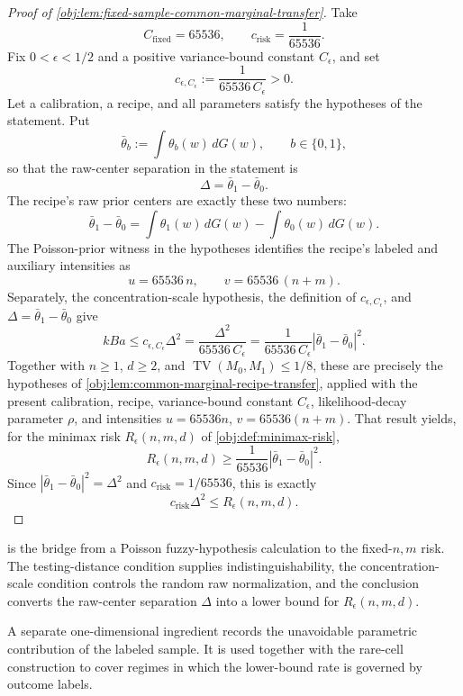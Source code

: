 \documentclass[11pt]{article}
\begin{document}
\begin{proof}[Proof of \cref{obj:lem:fixed-sample-common-marginal-transfer}]
Take
\[
C_{\mathrm{fixed}}=65536,
\qquad
c_{\mathrm{risk}}=\frac1{65536}.
\]
Fix \(0<\epsilon<1/2\) and a positive variance-bound constant \(C_\epsilon\), and set
\[
c_{\epsilon,C_\epsilon}:=\frac{1}{65536\,C_\epsilon}>0.
\]
Let a calibration, a recipe, and all parameters satisfy the hypotheses of the statement.  Put
\[
\bar\theta_b:=\int \theta_b(w)\,dG(w),\qquad b\in\{0,1\},
\]
so that the raw-center separation in the statement is
\[
\Delta=\bar\theta_1-\bar\theta_0.
\]
The recipe's raw prior centers are exactly these two numbers:
\[
\bar\theta_1-\bar\theta_0
=
\int \theta_1(w)\,dG(w)-\int \theta_0(w)\,dG(w).
\]
The Poisson-prior witness in the hypotheses identifies the recipe's labeled and auxiliary intensities as
\[
u=65536\,n,
\qquad
v=65536\,(n+m).
\]
Separately, the concentration-scale hypothesis, the definition of \(c_{\epsilon,C_\epsilon}\), and \(\Delta=\bar\theta_1-\bar\theta_0\) give
\[
kBa
\le
c_{\epsilon,C_\epsilon}\Delta^2
=
\frac{\Delta^2}{65536\,C_\epsilon}
=
\frac{1}{65536\,C_\epsilon}
\left|\bar\theta_1-\bar\theta_0\right|^2.
\]
Together with \(n\ge1\), \(d\ge2\), and \(\operatorname{TV}(M_0,M_1)\le1/8\), these are precisely the hypotheses of \cref{obj:lem:common-marginal-recipe-transfer}, applied with the present calibration, recipe, variance-bound constant \(C_\epsilon\), likelihood-decay parameter \(\rho\), and intensities \(u=65536n\), \(v=65536(n+m)\).  That result yields, for the minimax risk \(R_\epsilon(n,m,d)\) of \cref{obj:def:minimax-risk},
\[
R_\epsilon(n,m,d)
\ge
\frac{1}{65536}
\left|\bar\theta_1-\bar\theta_0\right|^2.
\]
Since \(|\bar\theta_1-\bar\theta_0|^2=\Delta^2\) and \(c_{\mathrm{risk}}=1/65536\), this is exactly
\[
c_{\mathrm{risk}}\Delta^2\le R_\epsilon(n,m,d).
\] %
\end{proof}

 is the bridge from a Poisson fuzzy-hypothesis calculation to the fixed-\(n,m\) risk. The testing-distance condition supplies indistinguishability, the concentration-scale condition controls the random raw normalization, and the conclusion converts the raw-center separation \(\Delta\) into a lower bound for \(R_\epsilon(n,m,d)\).

A separate one-dimensional ingredient records the unavoidable parametric contribution of the labeled sample. It is used together with the rare-cell construction to cover regimes in which the lower-bound rate is governed by outcome labels.
\end{document}
